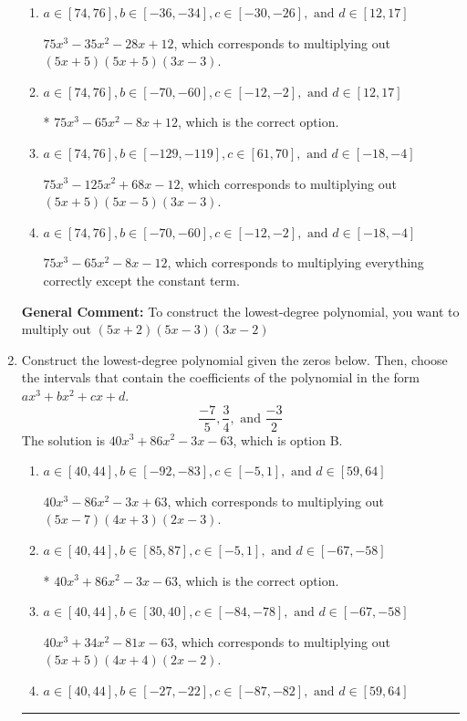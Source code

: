 \documentclass{extbook}[14pt]
\newcommand{\litem}[1]{\item #1

\rule{\textwidth}{0.4pt}}
\begin{document}
\begin{enumerate}
{\begin{enumerate}[label=\Alph*.]
$75x^{3} +65 x^{2} -8 x -12$, which corresponds to multiplying out $(5x -2)(5x + 3)(3x + 2)$.
\item \( a \in [74, 76], b \in [-36, -34], c \in [-30, -26], \text{ and } d \in [12, 17] \)

$75x^{3} -35 x^{2} -28 x + 12$, which corresponds to multiplying out $(5x + 5)(5x + 5)(3x -3)$.
\item \( a \in [74, 76], b \in [-70, -60], c \in [-12, -2], \text{ and } d \in [12, 17] \)

* $75x^{3} -65 x^{2} -8 x + 12$, which is the correct option.
\item \( a \in [74, 76], b \in [-129, -119], c \in [61, 70], \text{ and } d \in [-18, -4] \)

$75x^{3} -125 x^{2} +68 x -12$, which corresponds to multiplying out $(5x + 5)(5x -5)(3x -3)$.
\item \( a \in [74, 76], b \in [-70, -60], c \in [-12, -2], \text{ and } d \in [-18, -4] \)

$75x^{3} -65 x^{2} -8 x -12$, which corresponds to multiplying everything correctly except the constant term.
\end{enumerate}

\textbf{General Comment:} To construct the lowest-degree polynomial, you want to multiply out $(5x + 2)(5x -3)(3x -2)$
}
\litem{
Construct the lowest-degree polynomial given the zeros below. Then, choose the intervals that contain the coefficients of the polynomial in the form $ax^3+bx^2+cx+d$.
\[ \frac{-7}{5}, \frac{3}{4}, \text{ and } \frac{-3}{2} \]
The solution is \( 40x^{3} +86 x^{2} -3 x -63 \), which is option B.\begin{enumerate}[label=\Alph*.]
\item \( a \in [40, 44], b \in [-92, -83], c \in [-5, 1], \text{ and } d \in [59, 64] \)

$40x^{3} -86 x^{2} -3 x + 63$, which corresponds to multiplying out $(5x -7)(4x + 3)(2x -3)$.
\item \( a \in [40, 44], b \in [85, 87], c \in [-5, 1], \text{ and } d \in [-67, -58] \)

* $40x^{3} +86 x^{2} -3 x -63$, which is the correct option.
\item \( a \in [40, 44], b \in [30, 40], c \in [-84, -78], \text{ and } d \in [-67, -58] \)

$40x^{3} +34 x^{2} -81 x -63$, which corresponds to multiplying out $(5x + 5)(4x + 4)(2x -2)$.
\item \( a \in [40, 44], b \in [-27, -22], c \in [-87, -82], \text{ and } d \in [59, 64] \)


\end{enumerate}}
\end{enumerate}
\end{document}

